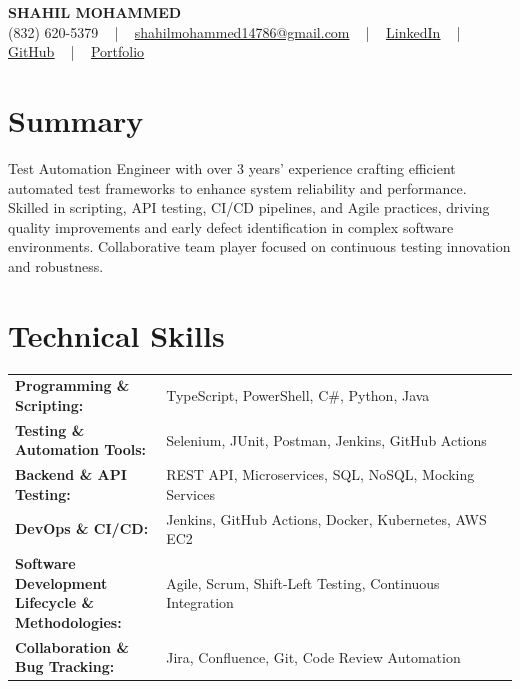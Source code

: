 \documentclass[letterpaper,11pt]{article}
\begin{document}
\begin{center}
    {\fontsize{14pt}{12pt}\selectfont \textbf{\MakeUppercase{Shahil Mohammed}}}\\ \vspace{2pt}
    \fontsize{10pt}{12pt}\selectfont (832) 620-5379 ~ | ~ \href{mailto:shahilmohammed14786@gmail.com}{shahilmohammed14786@gmail.com} ~ | ~  
    \href{https://www.linkedin.com/in/shahil-mohammed-9652931a1/}{\color{blue}\underline{LinkedIn}}  ~ | ~ 
    \href{https://github.com/freakbeast14}{\color{blue}\underline{GitHub}} ~ | ~ 
    \href{https://shahil-mohammed.netlify.app/}{\color{blue}\underline{Portfolio}}
    \vspace{-8pt}
\end{center}

\section{Summary}
\fontsize{9pt}{10pt}\selectfont
Test Automation Engineer with over 3 years' experience crafting efficient automated test frameworks to enhance system reliability and performance. Skilled in scripting, API testing, CI/CD pipelines, and Agile practices, driving quality improvements and early defect identification in complex software environments. Collaborative team player focused on continuous testing innovation and robustness.

 \vspace{-5pt}
 
\section{Technical Skills}
        \vspace{-14pt}
        \begin{table}[h]
            \fontsize{9pt}{10pt}\selectfont
            \begin{tabular}{p{0.3\linewidth} p{0.7\linewidth}}
                \textbf{Programming \& Scripting:} & TypeScript, PowerShell, C\#, Python, Java \\
                \textbf{Testing \& Automation Tools:} & Selenium, JUnit, Postman, Jenkins, GitHub Actions \\
                \textbf{Backend \& API Testing:} & REST API, Microservices, SQL, NoSQL, Mocking Services \\
                \textbf{DevOps \& CI/CD:} & Jenkins, GitHub Actions, Docker, Kubernetes, AWS EC2 \\
                \textbf{Software Development Lifecycle \& Methodologies:} & Agile, Scrum, Shift-Left Testing, Continuous Integration \\
                \textbf{Collaboration \& Bug Tracking:} & Jira, Confluence, Git, Code Review Automation \\
            \end{tabular}
        \end{table}
 \vspace{-15pt}
 
\end{document}
